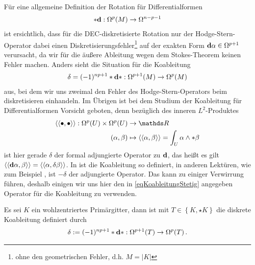   Für eine allgemeine Definition der Rotation für Differentialformen 
  \begin{align}
    *\mathbf{d}: \Omega^{p}(M) \rightarrow \Omega^{n-p-1}
  \end{align} 
  ist ersichtlich,
  dass für die DEC-diskretisierte Rotation nur der Hodge-Stern-Operator dabei einen Diskretisierungsfehler\footnote{ohne den geometrischen Fehler, d.h. \( M = |K| \)}
  auf der exakten Form \( \mathbf{d}\alpha\in\Omega^{p+1} \) verursacht, da wir für die äußere Ableitung wegen dem Stokes-Theorem keinen Fehler machen.
  Anders sieht die Situation für die Koableitung
  \begin{align}
    \label{eqKoableitungStetig}
    \delta = (-1)^{np+1}*\mathbf{d} *: \Omega^{p+1}(M) \rightarrow \Omega^{p}(M)
  \end{align}
  aus, bei dem wir uns zweimal den Fehler des Hodge-Stern-Operators beim diskretisieren einhandeln.
  Im Übrigen ist bei dem Studium der Koableitung für Differentialformen Vorsicht geboten, denn bezüglich des inneren \( L^{2} \)-Produktes
  \begin{align}
  \begin{aligned}
    \left\langle\left\langle \bullet, \bullet \right\rangle\right\rangle: \Omega^{p}(U)\times\Omega^{p}(U) &\rightarrow \R \\
                            \left( \alpha, \beta \right) &\mapsto \left\langle\left\langle \alpha, \beta \right\rangle\right\rangle
                                                                  = \int_{U} \alpha \wedge *\beta
  \end{aligned}
  \end{align}
  ist hier gerade \( \delta \) der formal adjungierte Operator zu \( \mathbf{d} \), 
  das heißt es gilt 
  \( \left\langle\left\langle \mathbf{d}\alpha, \beta \right\rangle\right\rangle = \left\langle\left\langle \alpha, \delta\beta \right\rangle\right\rangle\).
  In \cite{Marsden} ist die Koableitung so definiert, in anderen Lektüren, wie zum Beispiel \cite{jaenich}, ist \( -\delta \) der adjungierte Operator.
  Das kann zu einiger Verwirrung führen, deshalb einigen wir uns hier den in \eqref{eqKoableitungStetig} angegeben Operator für die Koableitung zu verwenden.

  \begin{definition}
    Es sei \( K \) ein wohlzentriertes Primärgitter, dann ist mit \( T\in\left\{ K, \star K \right\} \) die diskrete Koableitung definiert durch
    \begin{align}
      \delta := (-1)^{np+1}*\mathbf{d} *: \Omega^{p+1}(T) \rightarrow \Omega^{p}(T) \,\text{.}
    \end{align}
  \end{definition}

